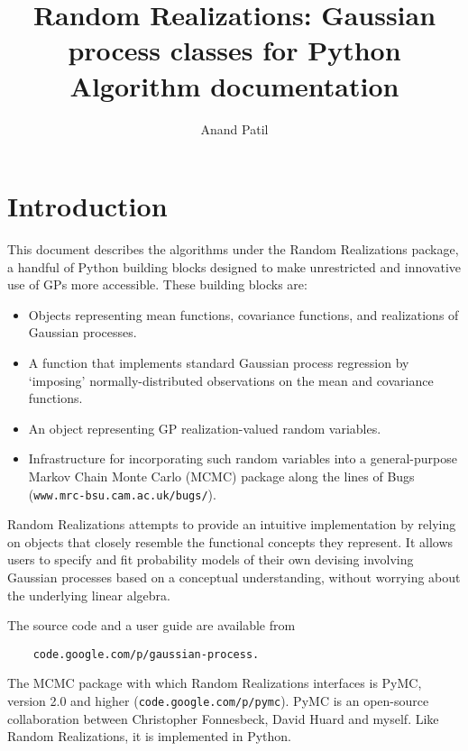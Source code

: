 \documentclass{report}
\begin{document}
\title{Random Realizations: Gaussian process classes for Python\\
Algorithm documentation}
\author{Anand Patil}
\maketitle
\tableofcontents
    
\chapter{Introduction}\label{cha:introduction} %

This document describes the algorithms under the Random Realizations package, a handful of Python building blocks designed to make unrestricted and innovative use of GPs more accessible. These building blocks are:
\begin{itemize}
    \item Objects representing mean functions, covariance functions, and realizations of Gaussian processes.
    \item A function that implements standard Gaussian process regression by `imposing' normally-distributed observations on the mean and covariance functions.
    \item An object representing GP realization-valued random variables.
    \item Infrastructure for incorporating such random variables into a general-purpose Markov Chain Monte Carlo (MCMC) \cite{gelman} package along the lines of Bugs \linebreak (\texttt{www.mrc-bsu.cam.ac.uk/bugs/}).
\end{itemize}
Random Realizations attempts to provide an intuitive implementation by relying on objects that closely resemble the functional concepts they represent. It allows users to specify and fit probability models of their own devising involving Gaussian processes based on a conceptual understanding, without worrying about the underlying linear algebra.

The source code and a user guide are available from 
\begin{verbatim}
    code.google.com/p/gaussian-process.
\end{verbatim}

The MCMC package with which Random Realizations interfaces is PyMC, version 2.0 and higher (\texttt{code.google.com/p/pymc}). PyMC is an open-source collaboration between Christopher Fonnesbeck, David Huard and myself. Like Random Realizations, it is implemented in Python.
\end{document}
